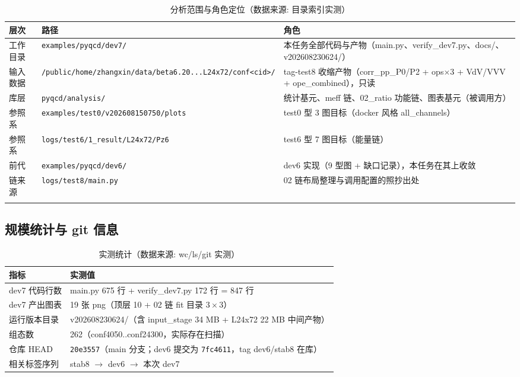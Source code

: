 \documentclass[UTF8]{ctexart}
\begin{document}
\begin{xltabular}{\textwidth}{llX}
\toprule
\textcolor{struct}{层次} & 路径 & \textcolor{struct}{角色} \\
\midrule
\endhead
工作目录 & \texttt{\nolinkurl{examples/pyqcd/dev7/}} & 本任务全部代码与产物（main.py、verify\_dev7.py、docs/、v202608230624/） \\
输入数据 & \texttt{\nolinkurl{/public/home/zhangxin/data/beta6.20...L24x72/conf<cid>/}} & tag-test8 收缩产物（corr\_pp\_P0/P2 + ops$\times$3 + VdV/VVV + ope\_combined），只读 \\
库层 & \texttt{\nolinkurl{pyqcd/analysis/}} & 统计基元、meff 链、02\_ratio 功能链、图表基元（被调用方） \\
参照系 & \texttt{\nolinkurl{examples/test0/v202608150750/plots}} & test0 型 3 图目标（docker 风格 all\_channels） \\
参照系 & \texttt{\nolinkurl{logs/test6/1\_result/L24x72/Pz6}} & test6 型 7 图目标（能量链） \\
前代 & \texttt{\nolinkurl{examples/pyqcd/dev6/}} & dev6 实现（9 型图 + 缺口记录），本任务在其上收敛 \\
链来源 & \texttt{\nolinkurl{logs/test8/main.py}} & 02 链布局整理与调用配置的照抄出处 \\
\bottomrule
\caption{分析范围与角色定位（数据来源: 目录索引实测）}
\end{xltabular}

\subsection{规模统计与 git 信息}
\begin{table}[htbp]\centering
\begin{tabular}{ll}
\toprule
指标 & 实测值 \\
\midrule
dev7 代码行数 & main.py 675 行 + verify\_dev7.py 172 行 = 847 行 \\
dev7 产出图表 & 19 张 png（顶层 10 + 02 链 fit 目录 $3\times3$） \\
运行版本目录 & v202608230624/（含 input\_stage 34 MB + L24x72 22 MB 中间产物） \\
组态数 & 262（conf4050..conf24300，实际存在扫描） \\
仓库 HEAD & \texttt{20e3557}（main 分支；dev6 提交为 \texttt{7fc4611}，tag dev6/stab8 在库） \\
相关标签序列 & stab8 $\to$ dev6 $\to$ 本次 dev7 \\
\bottomrule
\end{tabular}
\caption{实测统计（数据来源: wc/ls/git 实测）}
\end{table}
\end{document}
